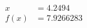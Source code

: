 \documentclass[preview]{standalone}
\begin{document}
\begin{align*}
x &= 4.2494\\f(x) &= 7.9266283
\end{align*}
\end{document}
